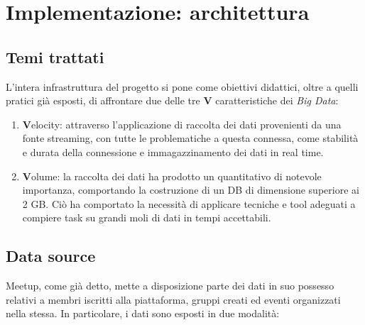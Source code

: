 \documentclass[fleqn,10pt]{SelfArx} %
\begin{document}
\section{Implementazione: architettura}
{\small %
\subsection{Temi trattati}
L'intera infrastruttura del progetto si pone come obiettivi didattici, oltre a quelli pratici già esposti, di affrontare due delle tre \textbf{V} caratteristiche dei \textit{Big Data}:
\begin{enumerate}
\item \textbf{V}elocity: attraverso l'applicazione di raccolta dei dati provenienti da una fonte streaming, con tutte le problematiche a questa connessa, come stabilità e durata della connessione e immagazzinamento dei dati in real time.
\item \textbf{V}olume: la raccolta dei dati ha prodotto un quantitativo di notevole importanza, comportando la costruzione di un DB di dimensione superiore ai 2 GB. Ciò ha comportato la necessità di applicare tecniche e tool adeguati a compiere task su grandi moli di dati in tempi accettabili.
\end{enumerate}
\subsection{Data source}%
Meetup, come già detto, mette a disposizione parte dei dati in suo possesso relativi a membri iscritti alla piattaforma, gruppi creati ed eventi organizzati nella stessa. 
In particolare, i dati sono esposti in due modalità: 

}
\end{document}
